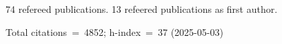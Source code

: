 74 refereed publications. 13 refeered publications as first author.

Total citations~=~4852; h-index~=~37 (2025-05-03)